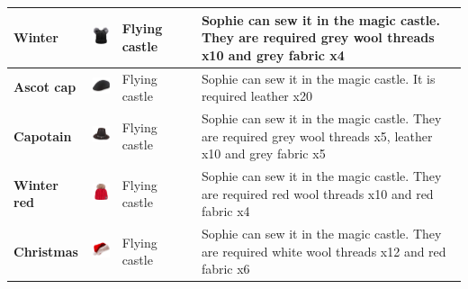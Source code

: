 \begin{longtable}[H]{|p{2cm}|p{1.5cm}|p{2cm}|p{2.8cm}|p{6.3cm}|}
\textbf{Winter}                      & \includegraphics[width=1.4cm]{Images/Hats/winter}             & Flying castle                                                  &                                                                                       & Sophie can sew it in the magic castle. They are required grey wool threads x10 and grey fabric x4                                      \\ \hline
\textbf{Ascot cap}                   & \includegraphics[width=1.4cm]{Images/Hats/ascotCap}           & Flying castle                                                  &                                                                                       & Sophie can sew it in the magic castle.  It is required leather x20                                                                     \\ \hline
\textbf{Capotain}                    & \includegraphics[width=1.4cm]{Images/Hats/capotain}           & Flying castle                                                  &                                                                                       & Sophie can sew it in the magic castle. They are required grey wool threads x5, leather x10 and grey fabric x5                          \\ \hline
\textbf{Winter red}                  & \includegraphics[width=1.4cm]{Images/Hats/winterRed}          & Flying castle                                                  &                                                                                       & Sophie can sew it in the magic castle. They are required red wool threads x10 and red fabric x4                                        \\ \hline
\textbf{Christmas}                   & \includegraphics[width=1.4cm]{Images/Hats/christmas}          & Flying castle                                                  &                                                                                       & Sophie can sew it in the magic castle. They are required white wool threads x12 and red fabric x6                                      \\ \hline

\end{longtable}
